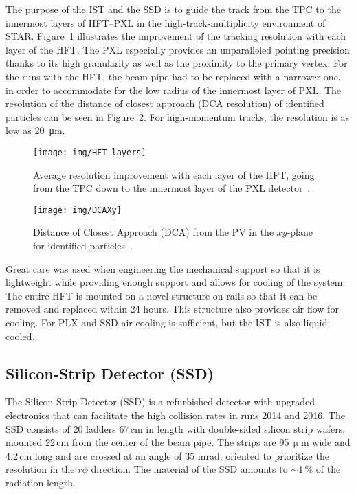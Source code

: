 The purpose of the IST and the SSD is to guide the track from the TPC to the innermost layers of HFT--PXL in the high-track-multiplicity environment of STAR. Figure~\ref{HFT_layers} illustrates the improvement of the tracking resolution with each layer of the HFT\@. The PXL especially provides an unparalleled pointing precision thanks to its high granularity as well as the proximity to the primary vertex. For the runs with the HFT, the beam pipe had to be replaced with a narrower one, in order to accommodate for the low radius of the innermost layer of PXL\@. The resolution of the distance of closest approach (DCA resolution) of identified particles can be seen in Figure~\ref{DCA}. For high-momentum tracks, the resolution is as low as \SI{20}{\micro\metre}.

\begin{figure}[!htb]
\begin{center}
 \texttt{[image: img/HFT\_layers]}\\
\end{center}
\caption{\label{HFT_layers}Average resolution improvement with each layer of the HFT, going from the TPC down to the innermost layer of the PXL detector~\cite{KubaVyzkumak}.}
\end{figure}

\begin{figure}[!htb]
\begin{center}
 \texttt{[image: img/DCAXy]}\\
\end{center}
\caption{\label{DCA}Distance of Closest Approach (DCA) from the PV in the $xy$-plane for identified particles~\cite{D0v2paper}.}
\end{figure}


Great care was used when engineering the mechanical support so that it is lightweight while providing enough support and allows for cooling of the system. The entire HFT is mounted on a novel structure on rails so that it can be removed and replaced within 24 hours. This structure also provides air flow for cooling. For PLX and SSD  air cooling is sufficient, but the IST is also liquid cooled.

\subsection{Silicon-Strip Detector (SSD)}

The Silicon-Strip Detector (SSD) is a refurbished detector with upgraded electronics that can facilitate the high collision rates in runs 2014 and 2016\@. The SSD consists of 20 ladders 67$\,$cm in length with double-sided silicon strip wafers, mounted 22$\,$cm from the center of the beam pipe. The strips are 95$\,\upmu$m wide and 4.2$\,$cm long and are crossed at an angle of 35 mrad, oriented to prioritize the resolution in the $r\phi$ direction. The material of the SSD amounts to $\sim$1$\,\%$ of the radiation length.

